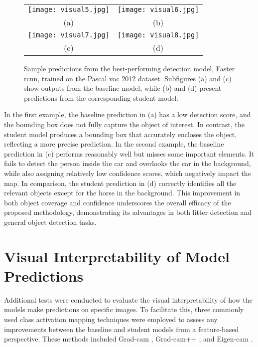 \begin{figure}[ht]
  \centering
  \begin{tabular}{cc}
    \texttt{[image: visual5.jpg]} &
    \texttt{[image: visual6.jpg]} \\
    \small (a) & \small (b) \\
    \addlinespace[1em]
    \texttt{[image: visual7.jpg]} &
    \texttt{[image: visual8.jpg]} \\
    \small (c) & \small (d) \\
  \end{tabular}
  \caption{Sample predictions from the best-performing detection model, Faster \gls{rcnn}, trained on the Pascal \gls{voc} 2012 dataset. Subfigures (a) and (c) show outputs from the baseline model, while (b) and (d) present predictions from the corresponding student model.}
  \label{fig:visuals_pascal_voc}
\end{figure}

In the first example, the baseline prediction in (a) has a low detection score, and the bounding box does not fully capture the object of interest. In contrast, the student model produces a bounding box that accurately encloses the object, reflecting a more precise prediction. In the second example, the baseline prediction in (c) performs reasonably well but misses some important elements. It fails to detect the person inside the car and overlooks the car in the background, while also assigning relatively low confidence scores, which negatively impact the \gls{map}.
In comparison, the student prediction in (d) correctly identifies all the relevant objects except for the horse in the background. This improvement in both object coverage and confidence underscores the overall efficacy of the proposed methodology, demonstrating its advantages in both litter detection and general object detection tasks.


\section{Visual Interpretability of Model Predictions}
\label{sec:5_interpretability}

Additional tests were conducted to evaluate the visual interpretability of how the models make predictions on specific images. To facilitate this, three commonly used class activation mapping techniques were employed to assess any improvements between the baseline and student models from a feature-based perspective. These methods included Grad-\gls{cam} \cite{gradcam}, Grad-\gls{cam}++ \cite{gradcam_plus_plus}, and Eigen-\gls{cam} \cite{eigencam}.

